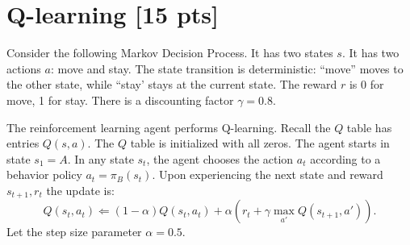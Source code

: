 \documentclass[a4paper]{article}
\theoremstyle{definition}
\begin{document}
\section{Q-learning [15 pts]}
Consider the following Markov Decision Process.
It has two states $s$. It has two actions $a$: move and stay. The state transition is deterministic: ``move'' moves to the other state, while ``stay' stays at the current state. The reward $r$ is 0 for move,  1 for stay. There is a discounting factor $\gamma=0.8$.
\\


The reinforcement learning agent performs Q-learning.  Recall the $Q$ table has entries $Q(s,a)$. The $Q$ table is initialized with all zeros. The agent starts in state $s_1=A$. In any state $s_t$, the agent chooses the action $a_t$ according to a behavior policy $a_t = \pi_B(s_t)$. Upon experiencing the next state and reward $s_{t+1}, r_t$ the update is:
$$Q(s_t, a_t) \Leftarrow (1-\alpha) Q(s_t, a_t) + \alpha \left( r_t + \gamma \max_{a'} Q(s_{t+1}, a') \right).$$
Let the step size parameter $\alpha=0.5$.
\end{document}
